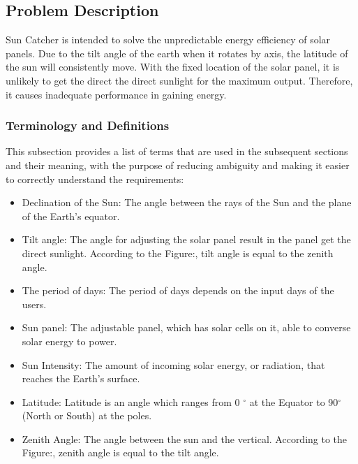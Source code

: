 \documentclass[12pt]{article}
\begin{document}
\subsection{Problem Description} \label{Sec_pd}

Sun Catcher is intended to solve the unpredictable energy efficiency of solar panels.
Due to the tilt angle of the earth when it rotates by axis, the latitude of the sun will 
consistently move. With the fixed location of the solar panel, it is unlikely to get the direct
the direct sunlight for the maximum output. Therefore, it causes inadequate performance in gaining energy.

\subsubsection{Terminology and  Definitions}

This subsection provides a list of terms that are used in the subsequent
sections and their meaning, with the purpose of reducing ambiguity and making it
easier to correctly understand the requirements:

\begin{itemize}

\item Declination of the Sun: The angle between the rays of the Sun and the plane of the Earth's equator.

\item Tilt angle: The angle for adjusting the solar panel result in the panel get the direct sunlight. According to the Figure:, tilt angle is equal to the zenith angle.

\item The period of days: The period of days depends on the input days of the users.

\item Sun panel: The adjustable panel, which has solar cells on it, able to converse solar energy
to power.

\item Sun Intensity: The amount of incoming solar energy, or radiation, that reaches the Earth's surface.

\item Latitude: Latitude is an angle which ranges from 0 $^\circ$ at the Equator to 90$^\circ$ (North or South) at the poles. 

\item Zenith Angle: The angle between the sun and the vertical. According to the Figure:, zenith angle is equal to the tilt angle.

\end{itemize}
\end{document}

